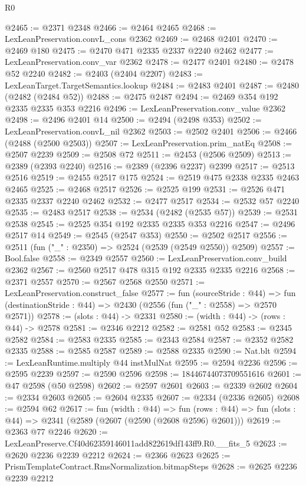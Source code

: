 \begin{lexlean}{R0}
\begin{coremodule}
@2465 := @2371 @2348
@2466 := @2464 @2465
@2468 := LexLeanPreservation.convL_cons @2362
@2469 := @2468 @2401
@2470 := @2469 @180
@2475 := @2470 @471 @2335 @2337 @2240 @2462
@2477 := LexLeanPreservation.conv_var @2362
@2478 := @2477 @2401
@2480 := @2478 @52 @2240
@2482 := @2403 (@2404 @2207)
@2483 := LexLeanTarget.TargetSemantics.lookup
@2484 := @2483 @2401
@2487 := @2480 (@2482 (@2484 @52))
@2488 := @2475 @2487
@2494 := @2469 @354 @192 @2335 @2335 @353 @2216
@2496 := LexLeanPreservation.conv_value @2362
@2498 := @2496 @2401 @14
@2500 := @2494 (@2498 @353)
@2502 := LexLeanPreservation.convL_nil @2362
@2503 := @2502 @2401
@2506 := @2466 (@2488 (@2500 @2503))
@2507 := LexLeanPreservation.prim_natEq
@2508 := @2507 @2239
@2509 := @2508 @72
@2511 := @2453 (@2506 @2509)
@2513 := @2389 (@2393 @2240)
@2516 := @2389 (@2396 @2237) @2399
@2517 := @2513 @2516
@2519 := @2455 @2517 @175
@2524 := @2519 @475 @2338 @2335 @2463 @2465
@2525 := @2468 @2517
@2526 := @2525 @199
@2531 := @2526 @471 @2335 @2337 @2240 @2462
@2532 := @2477 @2517
@2534 := @2532 @57 @2240
@2535 := @2483 @2517
@2538 := @2534 (@2482 (@2535 @57))
@2539 := @2531 @2538
@2545 := @2525 @354 @192 @2335 @2335 @353 @2216
@2547 := @2496 @2517 @14
@2549 := @2545 (@2547 @353)
@2550 := @2502 @2517
@2556 := @2511 (fun ("_" : @2350) => @2524 (@2539 (@2549 @2550)) @2509)
@2557 := Bool.false
@2558 := @2349 @2557
@2560 := LexLeanPreservation.conv_build @2362
@2567 := @2560 @2517 @478 @315 @192 @2335 @2335 @2216
@2568 := @2371 @2557
@2570 := @2567 @2568 @2550
@2571 := LexLeanPreservation.construct_false
@2577 := fun (sourceStride : @44) =>
  fun (destinationStride : @44) => @2430 (@2556 (fun ("_" : @2558) => @2570 @2571))
@2578 := (slots : @44) -> @2331
@2580 := (width : @44) -> (rows : @44) -> @2578
@2581 := @2346 @2212
@2582 := @2581 @52
@2583 := @2345 @2582
@2584 := @2583 @2335
@2585 := @2343 @2584
@2587 := @2352 @2582 @2335
@2588 := @2585 @2587
@2589 := @2588 @2335
@2590 := Nat.blt
@2594 := LexLeanRuntime.multiply @44 instMulNat
@2595 := @2594 @2236
@2596 := @2595 @2239
@2597 := @2590 @2596
@2598 := 18446744073709551616
@2601 := @47 @2598 (@50 @2598)
@2602 := @2597 @2601
@2603 := @2339 @2602
@2604 := @2334 @2603
@2605 := @2604 @2335
@2607 := @2334 (@2336 @2605)
@2608 := @2594 @62
@2617 := fun (width : @44) =>
  fun (rows : @44) => fun (slots : @44) => @2341 (@2589 (@2607 (@2590 (@2608 @2596) @2601)))
@2619 := @2363 @77 @2246
@2620 := LexLeanPreserve.Cf40d62359146011add822619df143ff9.R0.__fits_5
@2623 := @2620 @2236 @2239 @2212
@2624 := @2366 @2623
@2625 := PrismTemplateContract.RmsNormalization.bitmapSteps
@2628 := @2625 @2236 @2239 @2212

\end{coremodule}
\end{lexlean}
